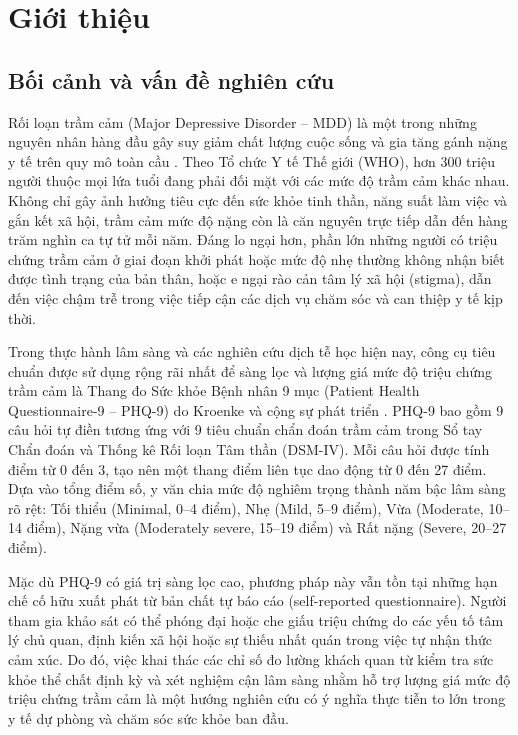 \chapter{Giới thiệu}
\label{ch:gioi-thieu}

\section{Bối cảnh và vấn đề nghiên cứu}
\label{sec:boi-canh}

Rối loạn trầm cảm (Major Depressive Disorder -- MDD) là một trong những nguyên nhân hàng đầu gây suy giảm chất lượng cuộc sống và gia tăng gánh nặng y tế trên quy mô toàn cầu \cite{pratt1991discriminant}. Theo Tổ chức Y tế Thế giới (WHO), hơn 300 triệu người thuộc mọi lứa tuổi đang phải đối mặt với các mức độ trầm cảm khác nhau. Không chỉ gây ảnh hưởng tiêu cực đến sức khỏe tinh thần, năng suất làm việc và gắn kết xã hội, trầm cảm mức độ nặng còn là căn nguyên trực tiếp dẫn đến hàng trăm nghìn ca tự tử mỗi năm. Đáng lo ngại hơn, phần lớn những người có triệu chứng trầm cảm ở giai đoạn khởi phát hoặc mức độ nhẹ thường không nhận biết được tình trạng của bản thân, hoặc e ngại rào cản tâm lý xã hội (stigma), dẫn đến việc chậm trễ trong việc tiếp cận các dịch vụ chăm sóc và can thiệp y tế kịp thời.

Trong thực hành lâm sàng và các nghiên cứu dịch tễ học hiện nay, công cụ tiêu chuẩn được sử dụng rộng rãi nhất để sàng lọc và lượng giá mức độ triệu chứng trầm cảm là Thang đo Sức khỏe Bệnh nhân 9 mục (Patient Health Questionnaire-9 -- PHQ-9) do Kroenke và cộng sự phát triển \cite{kroenke2001phq, spitzer1999validation}. PHQ-9 bao gồm 9 câu hỏi tự điền tương ứng với 9 tiêu chuẩn chẩn đoán trầm cảm trong Sổ tay Chẩn đoán và Thống kê Rối loạn Tâm thần (DSM-IV). Mỗi câu hỏi được tính điểm từ 0 đến 3, tạo nên một thang điểm liên tục dao động từ 0 đến 27 điểm. Dựa vào tổng điểm số, y văn chia mức độ nghiêm trọng thành năm bậc lâm sàng rõ rệt: Tối thiểu (Minimal, 0--4 điểm), Nhẹ (Mild, 5--9 điểm), Vừa (Moderate, 10--14 điểm), Nặng vừa (Moderately severe, 15--19 điểm) và Rất nặng (Severe, 20--27 điểm).

Mặc dù PHQ-9 có giá trị sàng lọc cao, phương pháp này vẫn tồn tại những hạn chế cố hữu xuất phát từ bản chất tự báo cáo (self-reported questionnaire). Người tham gia khảo sát có thể phóng đại hoặc che giấu triệu chứng do các yếu tố tâm lý chủ quan, định kiến xã hội hoặc sự thiếu nhất quán trong việc tự nhận thức cảm xúc. Do đó, việc khai thác các chỉ số đo lường khách quan từ kiểm tra sức khỏe thể chất định kỳ và xét nghiệm cận lâm sàng nhằm hỗ trợ lượng giá mức độ triệu chứng trầm cảm là một hướng nghiên cứu có ý nghĩa thực tiễn to lớn trong y tế dự phòng và chăm sóc sức khỏe ban đầu.

